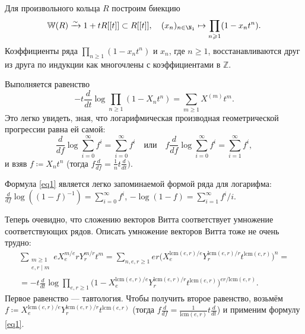 \documentclass[
	extrafontsizes,
	11pt,
	hyphens,
]{memoir}
\begin{document}

Для произвольного кольца \(R\) построим биекцию
\[
\mathbb{W}(R) \xrightarrow{\sim} 1 + t R[[t]] \subset R[[t]],
\quad
(x_n)_{n \in \N_1}
\mapsto
\prod_{n \geqslant 1} (1 - x_n t^n).
\]
Коэффициенты ряда
\(\prod_{n \geqslant 1} (1 - x_n t^n)\)
и \(x_n\), где \(n \geq 1\),
восстанавливаются друг из друга по индукции как
многочлены с коэффициентами в \(\mathbb{Z}\).

Выполняется равенство
\[
-t {\frac{d}{dt}} \log \prod_{n \geqslant 1} (1 - X_n t^n)
= \sum_{m \geqslant 1} X^{(m)} t^m.
\]
Это легко увидеть, зная, что логарифмическая производная геометрической прогрессии равна ей самой:
\begin{equation}\label{eq1}
\frac{d}{df} \log \sum_{i=0}^\infty f^i = \sum_{i=0}^\infty f^i
\quad
\text{или}
\quad
f \frac{d}{df} \log \sum_{i=0}^\infty f^i = \sum_{i=1}^\infty f^i,
\end{equation}
и взяв \(f \coloneqq X_n t^n\) (тогда \(f \frac{d}{df} = \frac{1}{n} t \frac{d}{dt})\).

\begin{remark}
Формула \eqref{eq1} является легко запоминаемой формой ряда для логарифма:
\(
\frac{d}{df} \log ((1-f)^{-1}) = \sum_{i=0}^\infty f^i
\),
\(
-\log(1-f) = \sum_{i=1}^\infty f^i/i
\).
\end{remark}

Теперь очевидно, что сложению векторов Витта соответствует ум\-но\-же\-ние соответствующих рядов.
Описать ум\-но\-же\-ние
векторов Витта
тоже не очень трудно:
\begin{gather*}
\sum_{\substack{m \geqslant 1 \\ e,r \mid m}}
	e X_e^{m/e}
	r Y_r^{m/r}
	t^m
   =
   \sum_{n,e,r \geqslant 1}
	er
	\bigl(
		X_e^{{\mathrm{lcm}(e,r)}/{e}}
		Y_r^{{\mathrm{lcm}(e,r)}/{r}}
		t^{\mathrm{lcm}(e,r)}
	\bigr)^n
   =\\
   =
   -t \frac{d}{dt}
   \log \prod_{e,r \geqslant 1}
	\bigl(1 -
		X_e^{{\mathrm{lcm}(e,r)}/{e}}
		Y_r^{{\mathrm{lcm}(e,r)}/{r}}
		t^{\mathrm{lcm}(e,r)}
	\bigr)^{{er}/{\mathrm{lcm}(e,r)}}.
\end{gather*}
Первое равенство --- тавтология.
Чтобы получить второе равенство, возьмём
\(
	f \coloneqq
	X_e^{{\mathrm{lcm}(e,r)}/{e}}
	Y_r^{{\mathrm{lcm}(e,r)}/{r}}
	t^{\mathrm{lcm}(e,r)}
\)
(тогда \(f \frac{d}{df} = \frac{1}{\mathrm{lcm}(e,r)} t \frac{d}{dt}\))
и применим формулу \eqref{eq1}.
\end{document}

